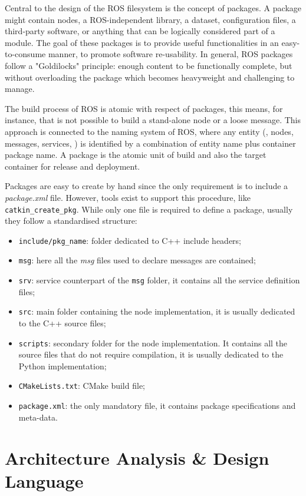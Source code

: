 Central to the design of the ROS filesystem is the concept of packages. A package might contain nodes, a ROS-independent library, a dataset, configuration files, a third-party software, or anything that can be logically considered part of a module. The goal of these packages is to provide useful functionalities in an easy-to-consume manner, to promote software re-usability. In general, ROS packages follow a "Goldilocks" principle: enough content to be functionally complete, but without overloading the package which becomes heavyweight and challenging to manage.

The build process of ROS is atomic with respect of packages, this means, for instance, that is not possible to build a stand-alone node or a loose message. This approach is connected to the naming system of ROS, where any entity (\eg, nodes, messages, services, \etc) is identified by a combination of entity name plus container package name. A package is the atomic unit of build and also the target container for release and deployment.

Packages are easy to create by hand since the only requirement is to include a \textit{package.xml} file. However, tools exist to support this procedure, like \texttt{catkin\_create\_pkg}. While only one file is required to define a package, usually they follow a standardised structure:
\begin{itemize}
\item \texttt{include/pkg\_name}: folder dedicated to C++ include headers;
\item \texttt{msg}: here all the \textit{msg} files used to declare messages are contained;
\item \texttt{srv}: service counterpart of the \texttt{msg} folder, it contains all the service definition files;
\item \texttt{src}: main folder containing the node implementation, it is usually dedicated to the C++ source files;
\item \texttt{scripts}: secondary folder for the node implementation. It contains all the source files that do not require compilation, it is usually dedicated to the Python implementation; 
\item \texttt{CMakeLists.txt}: CMake build file;
\item \texttt{package.xml}: the only mandatory file, it contains package specifications and meta-data.
\end{itemize} 

\section{Architecture Analysis \& Design Language}
\label{sec:AADL}


